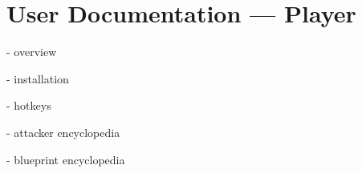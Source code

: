 \chapter{User Documentation --- Player}

- overview

- installation

- hotkeys

- attacker encyclopedia

- blueprint encyclopedia
